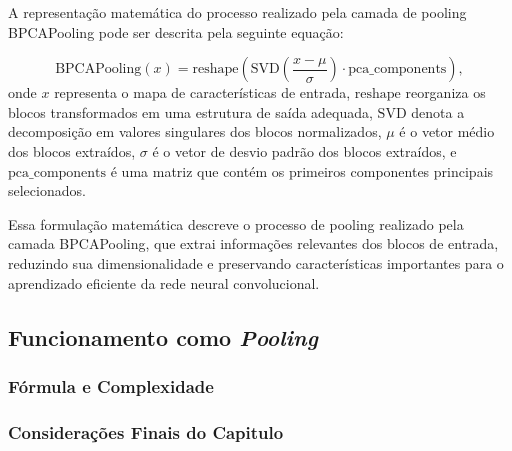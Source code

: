A representação matemática do processo realizado pela camada de pooling BPCAPooling pode ser descrita pela seguinte equação:

\[
\text{{BPCAPooling}}(x) = \text{{reshape}}\left(\text{{SVD}}\left(\frac{{x - \mu}}{{\sigma}}\right) \cdot \text{{pca\_components}}\right),
\]
onde $x$ representa o mapa de características de entrada, $\text{{reshape}}$ reorganiza os blocos transformados em uma estrutura de saída adequada, $\text{{SVD}}$ denota a decomposição em valores singulares dos blocos normalizados, $\mu$ é o vetor médio dos blocos extraídos, $\sigma$ é o vetor de desvio padrão dos blocos extraídos, e $\text{{pca\_components}}$ é uma matriz que contém os primeiros componentes principais selecionados.

Essa formulação matemática descreve o processo de pooling realizado pela camada BPCAPooling, que extrai informações relevantes dos blocos de entrada, reduzindo sua dimensionalidade e preservando características importantes para o aprendizado eficiente da rede neural convolucional.

\subsection{Funcionamento como \textit{Pooling}}

\subsubsection{Fórmula e Complexidade}

\subsubsection{Considerações Finais do Capitulo}

